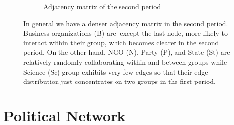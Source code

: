 \documentclass[12pt]{article}
\begin{document}
\begin{figure}[H]
\begin{subfigure}[b]{0.45\textwidth}
		\caption{Adjacency matrix of the second period}
		\label{fig:adj1}
	\end{subfigure}
	\caption{In general we have a denser adjacency matrix in the second period. Business organizations (B) are, except the last node, more likely to interact within their group, which becomes clearer in the second period. On the other hand, NGO (N), Party (P), and State (St) are relatively randomly collaborating within and between groups while Science (Sc) group exhibits very few edges so that their edge distribution just concentrates on two groups in the first period.}
\end{figure}


\newpage
\section*{Political Network}
\end{document}
